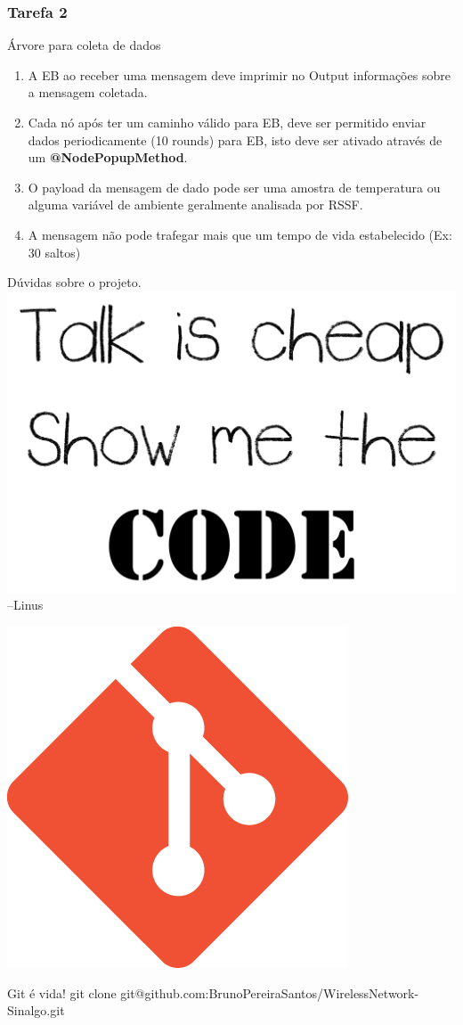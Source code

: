 \documentclass{beamer}
\begin{document}
\begin{frame}
	\frametitle{Tarefa 2}
	\begin{alertblock}{Árvore para coleta de dados}
		\begin{enumerate}
			
			\item A EB ao receber uma mensagem deve imprimir no Output informações sobre a mensagem coletada.
				
			\item Cada nó após ter um caminho válido para EB, deve ser permitido enviar dados periodicamente (10 rounds) para EB, isto deve ser ativado através de um \textbf{@NodePopupMethod}.  

			\item O payload da mensagem de dado pode ser uma amostra de temperatura ou alguma variável de ambiente geralmente analisada por RSSF.
			
			\item A mensagem não pode trafegar mais que um tempo de vida estabelecido (Ex: 30 saltos)
		\end{enumerate}
	\end{alertblock}
\end{frame}


\begin{frame}{Dúvidas sobre o projeto.}
	\centering
	\includegraphics[width=.6\linewidth]{img/torvalds.png}
	\flushright
	--Linus	
\end{frame}
\begin{frame}
\footnotesize
\centering

	\includegraphics[width=0.22\linewidth]{img/git.png}
	\begin{exampleblock}{Git é vida!}
		git clone git@github.com:BrunoPereiraSantos/WirelessNetwork-Sinalgo.git
	\end{exampleblock}
	
\end{frame}
\end{document}
